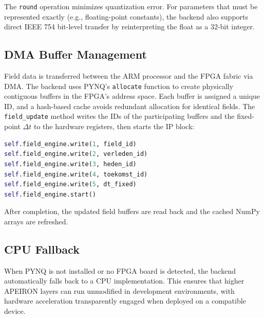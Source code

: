 The \texttt{round} operation minimizes quantization error. For parameters that must be represented exactly (e.g., floating-point constants), the backend also supports direct IEEE 754 bit-level transfer by reinterpreting the float as a 32-bit integer.

\subsection{DMA Buffer Management}

Field data is transferred between the ARM processor and the FPGA fabric via DMA. The backend uses PYNQ's \texttt{allocate} function to create physically contiguous buffers in the FPGA's address space. Each buffer is assigned a unique ID, and a hash-based cache avoids redundant allocation for identical fields. The \texttt{field\_update} method writes the IDs of the participating buffers and the fixed-point \(\Delta t\) to the hardware registers, then starts the IP block:
\newpage
\begin{lstlisting}[language=Python, caption={Initiating an FPGA field update.}]
self.field_engine.write(1, field_id)
self.field_engine.write(2, verleden_id)
self.field_engine.write(3, heden_id)
self.field_engine.write(4, toekomst_id)
self.field_engine.write(5, dt_fixed)
self.field_engine.start()
\end{lstlisting}

After completion, the updated field buffers are read back and the cached NumPy arrays are refreshed.

\subsection{CPU Fallback}

When PYNQ is not installed or no FPGA board is detected, the backend automatically falls back to a CPU implementation. This ensures that higher APEIRON layers can run unmodified in development environments, with hardware acceleration transparently engaged when deployed on a compatible device.